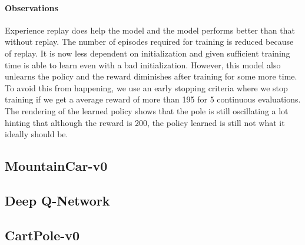 \documentclass[12pt]{article}
\begin{document}
\paragraph{Observations} Experience replay does help the model and the model performs better than that without replay. The number of episodes required for training is reduced because of replay. It is now less dependent on initialization and given sufficient training time is able to learn even with a bad initialization. However, this model also unlearns the policy and the reward diminishes after training for some more time. To avoid this from happening, we use an early stopping criteria where we stop training if we get a average reward of more than 195 for 5 continuous evaluations. The rendering of the learned policy shows that the pole is still oscillating a lot hinting that although the reward is 200, the policy learned is still not what it ideally should be.

\pagebreak[4]
\subsection*{MountainCar-v0}

\pagebreak[4]
\subsection{Deep Q-Network}
\subsection*{CartPole-v0}
\end{document}
